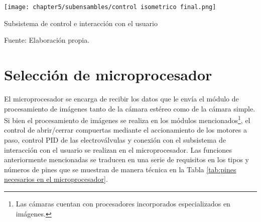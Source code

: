 \begin{myfigure}[H]
	\footnotesize\centering
	\texttt{[image: chapter5/subensambles/control isometrico final.png]}
	\caption{Subsistema de control e interacción con el usuario}
	\begin{myflushcenter}
		Fuente: Elaboración propia.
	\end{myflushcenter}
	\label{fig:subsistema de control e interaccion con el usuario}
\end{myfigure}

\section{Selección de microprocesador}
\label{sssec:seleccion de microprocesador}

El microprocesador se encarga de recibir los datos que le envía el módulo de procesamiento de imágenes tanto de la cámara estéreo como de la cámara simple. Si bien el procesamiento de imágenes se realiza en los módulos mencionados\footnote{Las cámaras cuentan con procesadores incorporados especializados en imágenes.}, el control de abrir/cerrar compuertas mediante el accionamiento de los motores a paso, control PID de las electroválvulas y conexión con el subsistema de interacción con el usuario se realizan en el microprocesador. Las funciones anteriormente mencionadas se traducen en una serie de requisitos en los tipos y números de pines que se muestran de manera técnica en la Tabla \ref{tab:pines necesarios en el microprocesador}.



